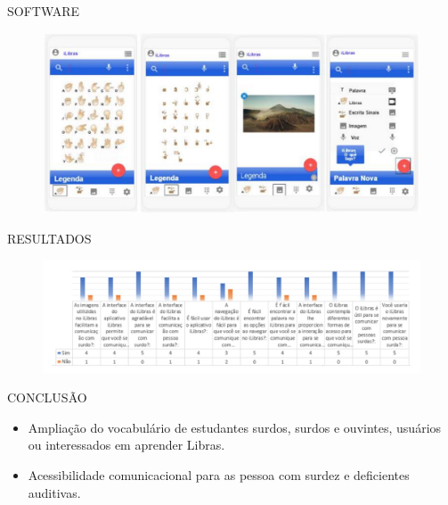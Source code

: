 \documentclass{Alexandre}
\begin{document}
\begin{frame}{SOFTWARE}
    
    \begin{figure}
        \includegraphics[scale = 0.25]{Figuras/Gestos.jpg}
    \end{figure}

\end{frame}


\begin{frame}{RESULTADOS}
    
    \begin{figure}
        \includegraphics[scale = 0.28]{Figuras/Resultados.jpg}
    \end{figure}

\end{frame}


\begin{frame}{CONCLUSÃO}
    
    \begin{itemize}
        \item Ampliação do vocabulário de estudantes surdos, surdos e ouvintes, usuários ou interessados em aprender Libras.
        \item Acessibilidade comunicacional para as pessoa com surdez e deficientes auditivas. 
    \end{itemize}

\end{frame}
\end{document}
